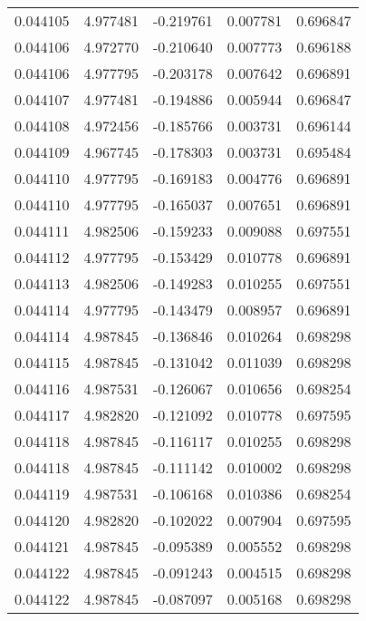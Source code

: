 \begin{tabular}{lrrrr}
0.044105    &  4.977481 & -0.219761 &  0.007781 &             0.696847 \\
0.044106    &  4.972770 & -0.210640 &  0.007773 &             0.696188 \\
0.044106    &  4.977795 & -0.203178 &  0.007642 &             0.696891 \\
0.044107    &  4.977481 & -0.194886 &  0.005944 &             0.696847 \\
0.044108    &  4.972456 & -0.185766 &  0.003731 &             0.696144 \\
0.044109    &  4.967745 & -0.178303 &  0.003731 &             0.695484 \\
0.044110    &  4.977795 & -0.169183 &  0.004776 &             0.696891 \\
0.044110    &  4.977795 & -0.165037 &  0.007651 &             0.696891 \\
0.044111    &  4.982506 & -0.159233 &  0.009088 &             0.697551 \\
0.044112    &  4.977795 & -0.153429 &  0.010778 &             0.696891 \\
0.044113    &  4.982506 & -0.149283 &  0.010255 &             0.697551 \\
0.044114    &  4.977795 & -0.143479 &  0.008957 &             0.696891 \\
0.044114    &  4.987845 & -0.136846 &  0.010264 &             0.698298 \\
0.044115    &  4.987845 & -0.131042 &  0.011039 &             0.698298 \\
0.044116    &  4.987531 & -0.126067 &  0.010656 &             0.698254 \\
0.044117    &  4.982820 & -0.121092 &  0.010778 &             0.697595 \\
0.044118    &  4.987845 & -0.116117 &  0.010255 &             0.698298 \\
0.044118    &  4.987845 & -0.111142 &  0.010002 &             0.698298 \\
0.044119    &  4.987531 & -0.106168 &  0.010386 &             0.698254 \\
0.044120    &  4.982820 & -0.102022 &  0.007904 &             0.697595 \\
0.044121    &  4.987845 & -0.095389 &  0.005552 &             0.698298 \\
0.044122    &  4.987845 & -0.091243 &  0.004515 &             0.698298 \\
0.044122    &  4.987845 & -0.087097 &  0.005168 &             0.698298 \\

\end{tabular}
